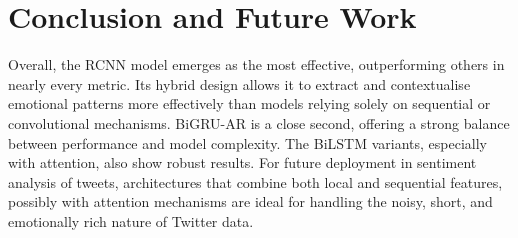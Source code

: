 \documentclass{article}
\begin{document}
\section{Conclusion and Future Work}

Overall, the RCNN model emerges as the most effective, outperforming others in nearly every metric. Its hybrid design allows it to extract and contextualise emotional patterns more effectively than models relying solely on sequential or convolutional mechanisms. BiGRU-AR is a close second, offering a strong balance between performance and model complexity. The BiLSTM variants, especially with attention, also show robust results. For future deployment in sentiment analysis of tweets, architectures that combine both local and sequential features, possibly with attention mechanisms are ideal for handling the noisy, short, and emotionally rich nature of Twitter data.
\end{document}
